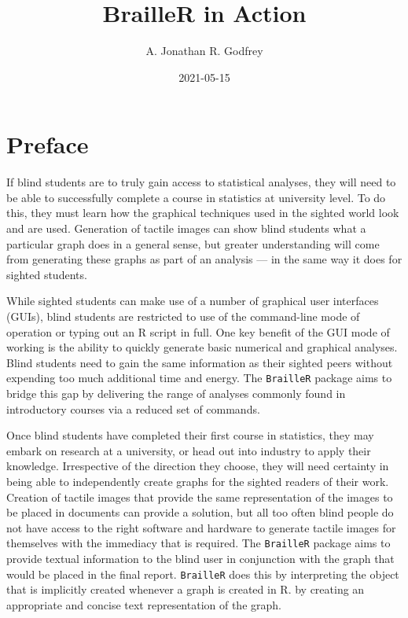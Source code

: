 \documentclass[
]{book}
\title{BrailleR in Action}
\author{A. Jonathan R. Godfrey}
\date{2021-05-15}
\begin{document}
\maketitle

{
\setcounter{tocdepth}{1}
\tableofcontents
}
\hypertarget{preface}{%
\chapter*{Preface}\label{preface}}

If blind students are to truly gain access to statistical analyses, they will need to be able to successfully complete a course in statistics at university level. To do this, they must learn how the graphical techniques used in the sighted world look and are used. Generation of tactile images can show blind students what a particular graph does in a general sense, but greater understanding will come from generating these graphs as part of an analysis --- in the same way it does for sighted students.

While sighted students can make use of a number of graphical user interfaces (GUIs), blind students are restricted to use of the command-line mode of operation or typing out an R script in full. One key benefit of the GUI mode of working is the ability to quickly generate basic numerical and graphical analyses. Blind students need to gain the same information as their sighted peers without expending too much additional time and energy. The \texttt{BrailleR} package aims to bridge this gap by delivering the range of analyses commonly found in introductory courses via a reduced set of commands.

Once blind students have completed their first course in statistics, they may embark on research at a university, or head out into industry to apply their knowledge. Irrespective of the direction they choose, they will need certainty in being able to independently create graphs for the sighted readers of their work.
Creation of tactile images that provide the same representation of the images to be placed in documents can provide a solution, but all too often blind people do not have access to the right software and hardware to generate tactile images for themselves with the immediacy that is required. The \texttt{BrailleR} package aims to provide textual information to the blind user in conjunction with the graph that would be placed in the final report. \texttt{BrailleR} does this by interpreting the object that is implicitly created whenever a graph is created in R. by creating an appropriate and concise text representation of the graph.
\end{document}
